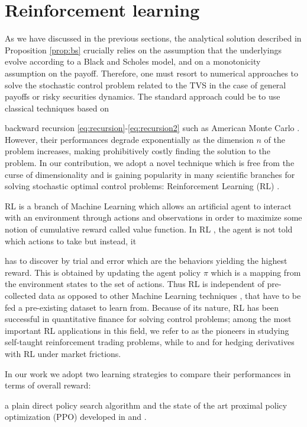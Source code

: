 \documentclass[runningheads]{m2ef}
\newcommand\soutpars[1]{\let\helpcmd\sout\parhelp#1\par\relax\relax}
\newcommand{\change}[1]{{\color{red} {#1}}}%
\newcommand{\remove}[1]{{\color{red} \soutpars{{#1}}}}%
\newcommand{\changeB}[1]{{\color{blue} {#1}}}%
\begin{document}
\section{Reinforcement learning}\label{sec:RL}
As we have discussed in the previous sections, \changeB{the analytical solution described in Proposition \ref{prop:bs} crucially relies on the assumption that the underlyings evolve according to a Black and Scholes model, and on a monotonicity assumption on the payoff. Therefore,}
one must resort to numerical approaches to solve the stochastic control problem related to the TVS in the case of general payoffs or risky securities dynamics. The standard approach could be to use classical techniques based on \remove{backwards} \change{backward} recursion \eqref{eq:recursion}-\eqref{eq:recursion2} such as American Monte Carlo \cite{Longstaff2001}. However, their performances degrade exponentially as the dimension $n$ of the problem increases, making prohibitively costly finding the solution to the problem. In our contribution, we adopt a novel technique which is free from the curse of dimensionality and is gaining popularity in many scientific branches for solving stochastic optimal control problems: Reinforcement Learning (RL) \cite{Sutton2018}. 

\remove{Reinforcement Learning} \change{RL} is a branch of Machine Learning which allows an artificial agent to interact with an environment through actions and observations in order to maximize some notion of cumulative reward \change{called value function}. In RL\change{,} the agent is not told which actions to take but instead, it \remove{must} \change{has to} discover by trial and error which are the behaviors  yielding the highest reward. This is obtained by updating the agent policy $\pi$ which is a mapping from the environment states to the set of actions. Thus RL is independent of pre-collected data as opposed to other Machine Learning techniques\change{, that have to be fed a pre-existing dataset to learn from}. Because of its nature, RL has been successful in quantitative finance for solving control problems; among the most important RL applications in this field, we refer to \cite{Deng2017} as the pioneers in studying self-taught reinforcement trading problems, while to \cite{Halperin2020} and \cite{Kolm2019} for hedging derivatives with RL under market frictions.

In our work we adopt two learning strategies to compare their performances in terms of overall reward: \remove{an \textit{ad hoc}} \change{a plain} direct policy \change{search} algorithm \change{\cite{Sutton2018}} and the state of the art proximal policy optimization (PPO) developed in \cite{Schulman2017} and \cite{Schulman2016}. 
\end{document}

